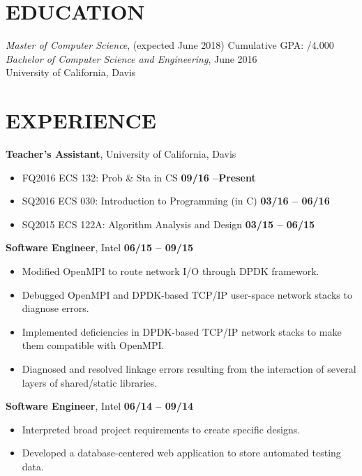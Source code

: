 \documentclass[10pt, letterpaper]{res}
\newcommand{\experience}[4]{
	{\bf #1}, #2 \hfill {\bf #3}
	\begin{itemize}[noitemsep]
		#4
    \end{itemize}
}
\begin{document}
\address{jmmcgee@ucdavis.edu | (323) 557-8647}

\begin{resume}


\section{EDUCATION}
    {\sl Master of Computer Science}, (expected June 2018) \hfill  Cumulative GPA: /4.000 \\
    {\sl Bachelor of Computer Science and Engineering}, June 2016 \\
    University of California, Davis

\section{EXPERIENCE}
	\experience{Teacher's Assistant}{University of California, Davis}{}{
		\item[] FQ2016 ECS 132: Prob \& Sta in CS \hfill {\bf 09/16 --\footnotesize Present}
		\item[] SQ2016 ECS 030: Introduction to Programming (in C) \hfill {\bf 03/16 -- 06/16}
		\item[] SQ2015 ECS 122A: Algorithm Analysis and Design \hfill {\bf 03/15 -- 06/15}
	}

    \experience{Software Engineer}{Intel}{06/15 -- 09/15}{
		\item Modified OpenMPI to route network I/O through DPDK framework.
		\item Debugged OpenMPI and DPDK-based TCP/IP user-space network stacks to diagnose errors.
		\item Implemented deficiencies in DPDK-based TCP/IP network stacks to make them compatible with OpenMPI.
		\item Diagnosed and resolved linkage errors resulting from the interaction of several layers of shared/static libraries.
    }

    \experience{Software Engineer}{Intel}{06/14 -- 09/14}{
		\item Interpreted broad project requirements to create specific designs.
		\item Developed a database-centered web application to store automated testing data.
    }


\end{resume}
\end{document}

